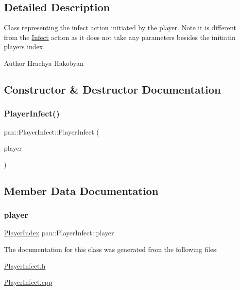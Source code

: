 \subsection{Detailed Description}
Class representing the infect action initiated by the player. Note it is different from the \hyperlink{classpan_1_1_infect}{Infect} action as it does not take any parameters besides the initiatin player\textquotesingle{}s index. 

\begin{DoxyAuthor}{Author}
Hrachya Hakobyan 
\end{DoxyAuthor}


\subsection{Constructor \& Destructor Documentation}
\mbox{\label{classpan_1_1_player_infect_afaa2f602426d0e215d93960bc965ace1}} 
\subsubsection{\texorpdfstring{Player\+Infect()}{PlayerInfect()}}
{\footnotesize\ttfamily pan\+::\+Player\+Infect\+::\+Player\+Infect (\begin{DoxyParamCaption}\item[{\hyperlink{namespacepan_a0cdabf874fbf1bb3a1f0152d108c2909}{Player\+Index}}]{player }\end{DoxyParamCaption})}



\subsection{Member Data Documentation}
\mbox{\label{classpan_1_1_player_infect_a315aa72113a32fe97b91ada9df0ccfa6}} 
\subsubsection{\texorpdfstring{player}{player}}
{\footnotesize\ttfamily \hyperlink{namespacepan_a0cdabf874fbf1bb3a1f0152d108c2909}{Player\+Index} pan\+::\+Player\+Infect\+::player}



The documentation for this class was generated from the following files\+:\begin{DoxyCompactItemize}
\item 
\hyperlink{_player_infect_8h}{Player\+Infect.\+h}\item 
\hyperlink{_player_infect_8cpp}{Player\+Infect.\+cpp}\end{DoxyCompactItemize}
